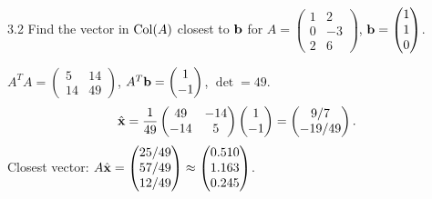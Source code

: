 \begin{exercise}{3.2}
Find the vector in $\operatorname{Col}(A)$ closest to $\mathbf{b}$ for $A=\begin{pmatrix}1&2\\0&-3\\2&6\end{pmatrix}$, $\mathbf{b}=\begin{pmatrix}1\\1\\0\end{pmatrix}$.
\end{exercise}
\begin{solution}
$A^TA=\begin{pmatrix}5&14\\14&49\end{pmatrix}$, $A^T\mathbf{b}=\begin{pmatrix}1\\-1\end{pmatrix}$, $\det=49$.
\[
\hat{\mathbf{x}}=\frac{1}{49}\begin{pmatrix}49&-14\\-14&5\end{pmatrix}\begin{pmatrix}1\\-1\end{pmatrix}=\begin{pmatrix}9/7\\-19/49\end{pmatrix}.
\]
Closest vector: $A\hat{\mathbf{x}}=\begin{pmatrix}25/49\\57/49\\12/49\end{pmatrix}\approx\begin{pmatrix}0.510\\1.163\\0.245\end{pmatrix}$.
\end{solution}

